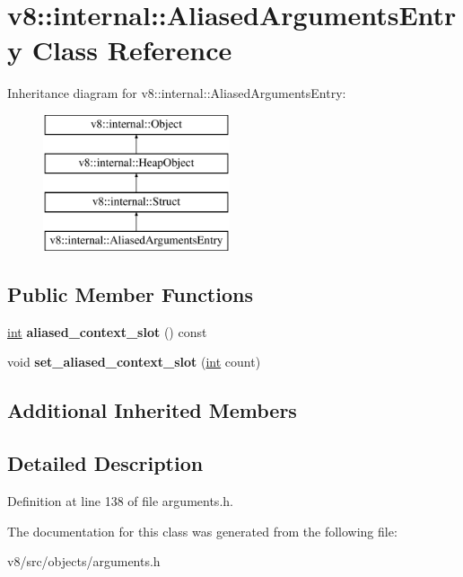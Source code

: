 \hypertarget{classv8_1_1internal_1_1AliasedArgumentsEntry}{}\section{v8\+:\+:internal\+:\+:Aliased\+Arguments\+Entry Class Reference}
\label{classv8_1_1internal_1_1AliasedArgumentsEntry}
Inheritance diagram for v8\+:\+:internal\+:\+:Aliased\+Arguments\+Entry\+:\begin{figure}[H]
\begin{center}
\leavevmode
\includegraphics[height=4.000000cm]{classv8_1_1internal_1_1AliasedArgumentsEntry}
\end{center}
\end{figure}
\subsection*{Public Member Functions}
\begin{DoxyCompactItemize}
\item 
\mbox{\label{classv8_1_1internal_1_1AliasedArgumentsEntry_adc997e9de703e6e969a887795e8b9689}} 
\mbox{\hyperlink{classint}{int}} {\bfseries aliased\+\_\+context\+\_\+slot} () const
\item 
\mbox{\label{classv8_1_1internal_1_1AliasedArgumentsEntry_ad2f671a7089a9e775abd7e1c039aeee7}} 
void {\bfseries set\+\_\+aliased\+\_\+context\+\_\+slot} (\mbox{\hyperlink{classint}{int}} count)
\end{DoxyCompactItemize}
\subsection*{Additional Inherited Members}


\subsection{Detailed Description}


Definition at line 138 of file arguments.\+h.



The documentation for this class was generated from the following file\+:\begin{DoxyCompactItemize}
\item 
v8/src/objects/arguments.\+h\end{DoxyCompactItemize}
